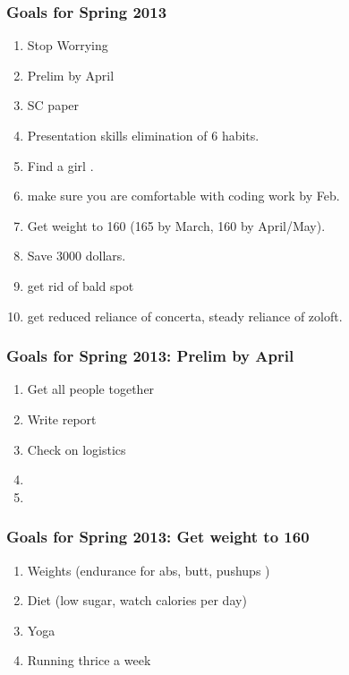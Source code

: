 \begin{frame}  
\frametitle{Goals for Spring 2013 }
\begin{enumerate} 
\item \tiny Stop Worrying
\item \tiny Prelim by April
\item \tiny SC paper 
\item \tiny Presentation skills elimination of 6 habits. 
\item \tiny Find a girl . 
\item \tiny make sure you are comfortable with coding work by Feb. 
\item \tiny Get weight to 160 (165 by March, 160 by April/May). 
\item \tiny Save 3000 dollars. 
\item \tiny get rid of bald spot
\item \tiny get reduced reliance of concerta, steady reliance of zoloft. 
\end{enumerate} 
\end{frame}


\begin{frame}  
\frametitle{Goals for Spring 2013: Prelim by April}
\begin{enumerate} 
\item \tiny Get all people together 
\item \tiny Write report
\item \tiny Check on logistics
\item \tiny 
\item \tiny 
\end{enumerate} 
\end{frame}

\begin{frame}  
\frametitle{Goals for Spring 2013: Get weight to 160 }
\begin{enumerate} 
\item Weights (endurance for abs, butt, pushups )
\item Diet (low sugar, watch calories per day) 
\item Yoga 
\item Running thrice a week
\end{enumerate} 
\end{frame}
